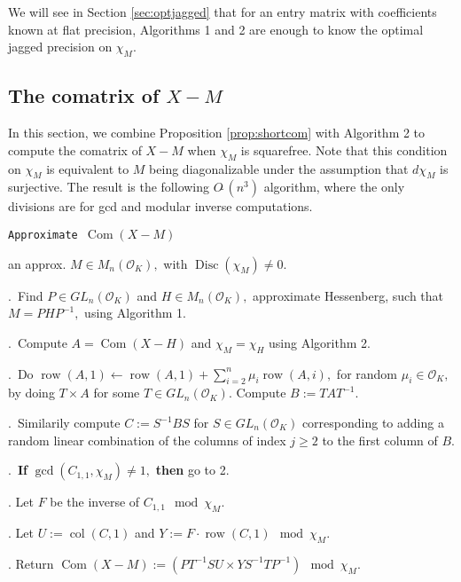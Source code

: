 \documentclass{sig-alternate-05-2015}
\DeclareMathOperator{\com}{Com}
\DeclareMathOperator{\disc}{Disc}
\DeclareMathOperator{\row}{row}
\DeclareMathOperator{\col}{col}
\newcommand{\OK}{\mathcal{O}_K}
\newcommand{\softO}{O\tilde{~}}
\begin{document}
We will see in Section \ref{sec:optjagged} that for an
entry matrix with coefficients known at flat precision,
Algorithms 1 and 2 are enough to
know the optimal jagged precision on $\chi_M.$

\subsection{The comatrix of $X{-}M$}

In this section, we combine Proposition \ref{prop:shortcom}
with Algorithm 2 to compute the comatrix of $X-M$
when $\chi_M$ is squarefree.   Note that this condition on
$\chi_M$ is equivalent to $M$ being diagonalizable under
the assumption that $d\chi_M$ is surjective.  The result is
the following $\softO(n^3)$ algorithm, where the only
divisions are for gcd and modular inverse computations.

\noindent\hrulefill

 {\tt Approximate $\com (X{-}M)$ }

 an approx. $M \in M_n(\OK),$ with $\disc(\chi_M) \neq 0.$ 

\smallskip

.\ Find $P \in GL_n(\OK)$ and $H \in M_n(\OK),$ approximate Hessenberg,
such that $M=PHP^{-1},$ using Algorithm 1. 

.\ Compute $A=\com (X-H)$ and $\chi_M = \chi_H$ using Algorithm 2.


.\ Do $\row(A,1) \leftarrow \row(A,1)+\sum_{i=2}^n \mu_i \row(A,i),$ for
random $\mu_i \in \OK,$ by doing $T \times A$ for some $T \in GL_n(\OK).$
Compute $B:=TAT^{-1}.$

.\ Similarily compute $C:=S^{-1}BS$ for $S \in GL_n(\OK)$ corresponding to
adding a random linear combination of the columns of index $j \ge 2$
to the first column of $B.$ 

.\  \textbf{If} $\gcd(C_{1,1}, \chi_M) \neq 1,$ \textbf{then} go to 2.

. Let $F$ be the inverse of $C_{1,1} \mod \chi_M$.

. Let $U := \col(C,1)$ and $Y := F \cdot \row(C,1) \mod \chi_M$.

. Return $\com(X-M):=(PT^{-1}S U \times Y S^{-1} T P^{-1}) \mod \chi_M.$

\vspace{-1ex}\noindent\hrulefill

\medskip
\end{document}
